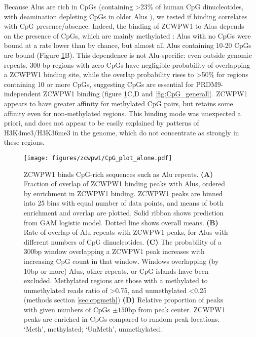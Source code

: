 Because Alus are rich in CpGs (containing >23\% of human CpG dinucleotides, with deamination depleting CpGs in older Alus \parencite{Luo2014Dynamic}), we tested if binding correlates with CpG presence/absence.
Indeed, the binding of ZCWPW1 to Alus depends on the presence of CpGs, which are mainly methylated \parencite{Gaysinskaya2018Transient}: Alus with no CpGs were bound at a rate lower than by chance, but almost all Alus containing 10-20 CpGs are bound (Figure \ref{fig:CpG}B).
This dependence is not Alu-specific: even outside genomic repeats, 300-bp regions with zero CpGs have negligible probability of overlapping a ZCWPW1 binding site, while the overlap probability rises to >50\% for regions containing 10 or more CpGs, suggesting CpGs are essential for PRDM9-independent ZCWPW1 binding (figure \ref{fig:CpG}C,D and \ref{fig:CpG_general}).
ZCWPW1 appears to have greater affinity for methylated CpG pairs, but retains some affinity even for non-methylated regions.
This binding mode was unexpected a priori, and does not appear to be easily explained by patterns of H3K4me3/H3K36me3 in the genome, which do not concentrate as strongly in these regions.

\begin{figure}[H]
	\centering
	\texttt{[image: figures/zcwpw1/CpG\_plot\_alone.pdf]}
	\caption[ZCWPW1 binds CpG rich sequences]{
		ZCWPW1 binds CpG-rich sequences such as Alu repeats.
		\textbf{(A)} Fraction of overlap of ZCWPW1 binding peaks with Alus, ordered by enrichment in ZCWPW1 binding.
			ZCWPW1 peaks are binned into 25 bins with equal number of data points, and means of both enrichment and overlap are plotted.
			Solid ribbon shows prediction from GAM logistic model.
			Dotted line shows overall means.
		\textbf{(B)} Rate of overlap of Alu repeats with ZCWPW1 peaks, for Alus with different numbers of CpG dinucleotides.
		\textbf{(C)} The probability of a 300bp window overlapping a ZCWPW1 peak increases with increasing CpG count in that window.
			Windows overlapping (by 10bp or more) Alus, other repeats, or CpG islands have been excluded.
			Methylated regions are those with a methylated to unmethylated reads ratio of >0.75, and unmethylated <0.25 (methods section \ref{sec:cpgmeth})
		\textbf{(D)} Relative proportion of peaks with given numbers of CpGs $\pm150$bp from peak center.
			ZCWPW1 peaks are enriched in CpGs compared to random peak locations.
			‘Meth’, methylated; ‘UnMeth’, unmethylated.
	}
	\label{fig:CpG}
\end{figure}


